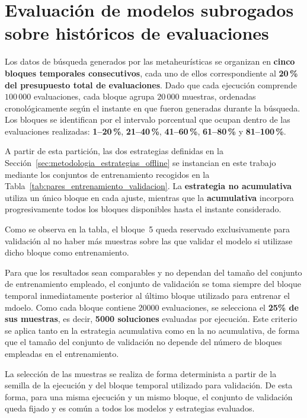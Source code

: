 \section{Evaluación de modelos subrogados sobre históricos de evaluaciones}

Los datos de búsqueda generados por las metaheurísticas se organizan en \textbf{cinco bloques temporales consecutivos}, cada uno de ellos correspondiente al \textbf{20\,\% del presupuesto total de evaluaciones}. Dado que cada ejecución comprende \(100\,000\) evaluaciones, cada bloque agrupa \(20\,000\) muestras, ordenadas cronológicamente según el instante en que fueron generadas durante la búsqueda. Los bloques se identifican por el intervalo porcentual que ocupan dentro de las evaluaciones realizadas: \textbf{1--20\,\%}, \textbf{21--40\,\%}, \textbf{41--60\,\%}, \textbf{61--80\,\%} y \textbf{81--100\,\%}.

A partir de esta partición, las dos estrategias definidas en la
Sección~\ref{sec:metodologia_estrategias_offline} se instancian en este trabajo mediante los
conjuntos de entrenamiento recogidos en la
Tabla~\ref{tab:pares_entrenamiento_validacion}. La \textbf{estrategia no acumulativa} utiliza un único bloque en cada ajuste, mientras que la \textbf{acumulativa} incorpora progresivamente todos los bloques disponibles hasta el instante considerado.



Como se observa en la tabla, el bloque~5 queda reservado exclusivamente para validación al no haber más muestras sobre las que validar el modelo si utilizase dicho bloque como entrenamiento.

Para que los resultados sean comparables y no dependan del tamaño del conjunto de entrenamiento empleado, el conjunto de validación se toma siempre del bloque temporal inmediatamente posterior al último bloque utilizado para entrenar el mdoelo. Como cada bloque contiene \(20000\)
evaluaciones, se selecciona el \textbf{25\% de sus muestras}, es decir, \textbf{5000 soluciones} evaluadas por ejecución. Este criterio se aplica tanto en la estrategia acumulativa como en la no acumulativa, de forma que el tamaño del conjunto de validación no depende del número de bloques empleadas en el entrenamiento.

La selección de las muestras se realiza de forma determinista a partir de la semilla de la ejecución y del bloque temporal utilizado para validación. De esta forma, para una misma ejecución y un mismo bloque, el conjunto de validación queda fijado y es común a todos los modelos y estrategias evaluados.

